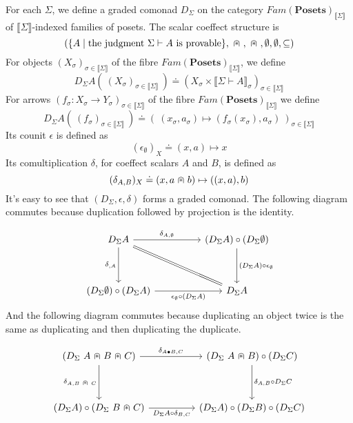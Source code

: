 \documentclass{article}
\newcommand{\mbf}{\mathbf}
\newcommand{\sem}[1]{\llbracket #1 \rrbracket}
\newcommand{\capdot}{~\stackinset{c}{}{c}{}{\scalebox{0.8}{$\ast$}}{$\cap$}~}
\begin{document}
For each $\Sigma$, we define a graded comonad $D_{\Sigma}$ on the category $\mathit{Fam}(\mbf{Posets})_{\sem{\Sigma}}$ of $\sem{\Sigma}$-indexed families of posets. The scalar coeffect structure is $$( \{ A \mid \text{the judgment } \Sigma \vdash A \text{ is provable} \}, \capdot, \capdot, \emptyset, \emptyset, \subseteq)$$ For objects $(X_\sigma)_{\sigma \in \sem{\Sigma}}$ of the fibre $\mathit{Fam}(\mbf{Posets})_{\sem{\Sigma}}$, we define $$D_{\Sigma} A(~(X_\sigma)_{\sigma \in \sem{\Sigma}}~) \doteq (X_\sigma \times \sem{\Sigma \vdash A}_\sigma)_{\sigma \in \sem{\Sigma}}$$ For arrows $(f_\sigma : X_\sigma \to Y_\sigma)_{\sigma \in \sem{\Sigma}}$ of the fibre $\mathit{Fam}(\mbf{Posets})_{\sem{\Sigma}}$ we define $$D_{\Sigma} A(~(f_\sigma)_{\sigma \in \sem{\Sigma}}~) \doteq (~(x_\sigma, a_\sigma) \mapsto (f_\sigma(x_\sigma),a_\sigma)~)_{\sigma \in \sem{\Sigma}}$$ Its counit $\epsilon$ is defined as $$(\epsilon_{\emptyset})_X \doteq (x,a) \mapsto x
$$ Its comultiplication $\delta$, for coeffect scalars $A$ and $B$, is defined as $$(\delta_{A,B})_X \doteq (x,a \capdot b) \mapsto ((x, a), b)$$ 
It's easy to see that $(D_{\Sigma}, \epsilon, \delta)$ forms a graded comonad. The following diagram commutes because duplication followed by projection is the identity.

\[\begin{tikzcd}
	{D_{\Sigma} A} && {(D_{\Sigma} A) \circ (D_{\Sigma} \emptyset)} \\
	\\
	{(D_{\Sigma} \emptyset) \circ (D_{\Sigma} A)} && {D_{\Sigma} A}
	\arrow["{\delta_{\empty,A}}"', from=1-1, to=3-1]
	\arrow["{\epsilon_{\emptyset} \circ (D_{\Sigma} A)}"', from=3-1, to=3-3]
	\arrow["{\delta_{A, \emptyset}}", from=1-1, to=1-3]
	\arrow["{(D_{\Sigma} A) \circ \epsilon_{\emptyset}}", from=1-3, to=3-3]
	\arrow[no head, equals, from=1-1, to=3-3]
\end{tikzcd}\]
And the following diagram commutes because duplicating an object twice is the same as duplicating and then duplicating the duplicate.

\[\begin{tikzcd}
	{(D_{\Sigma}~A \capdot B \capdot C)} && {(D_{\Sigma}~A \capdot B) \circ (D_{\Sigma} C)} \\
	\\
	{(D_{\Sigma} A) \circ (D_{\Sigma}~B \capdot C)} && {(D_{\Sigma} A) \circ (D_{\Sigma} B) \circ (D_{\Sigma} C)}
	\arrow["{\delta_{A, B \capdot C}}"', from=1-1, to=3-1]
	\arrow["{D_{\Sigma} A \circ \delta_{B,C}}"', from=3-1, to=3-3]
	\arrow["{\delta_{A \bullet B, C}}", from=1-1, to=1-3]
	\arrow["{\delta_{A,B} \circ D_{\Sigma} C}", from=1-3, to=3-3]
\end{tikzcd}\]
\end{document}
